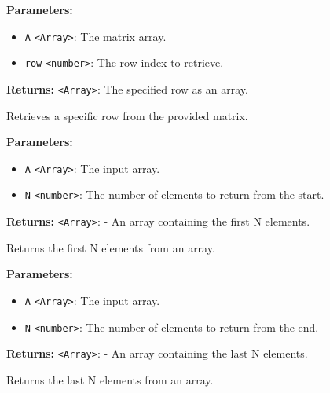 \documentclass[12pt,a4paper]{article}
\begin{document}
\vspace{5mm}
\noindent {}


\noindent \textbf{Parameters:}
\begin{itemize}
  \item \texttt{A} \texttt{<Array>}: The matrix array.
  \item \texttt{row} \texttt{<number>}: The row index to retrieve.
\end{itemize}

\noindent \textbf{Returns:} \texttt{<Array>}: The specified row as an array.

\noindent Retrieves a specific row from the provided matrix.

\vspace{5mm}
\noindent {}


\noindent \textbf{Parameters:}
\begin{itemize}
  \item \texttt{A} \texttt{<Array>}: The input array.
  \item \texttt{N} \texttt{<number>}: The number of elements to return from the start.
\end{itemize}

\noindent \textbf{Returns:} \texttt{<Array>}: - An array containing the first N elements.

\noindent Returns the first N elements from an array.

\vspace{5mm}
\noindent {}


\noindent \textbf{Parameters:}
\begin{itemize}
  \item \texttt{A} \texttt{<Array>}: The input array.
  \item \texttt{N} \texttt{<number>}: The number of elements to return from the end.
\end{itemize}

\noindent \textbf{Returns:} \texttt{<Array>}: - An array containing the last N elements.

\noindent Returns the last N elements from an array.
\end{document}
